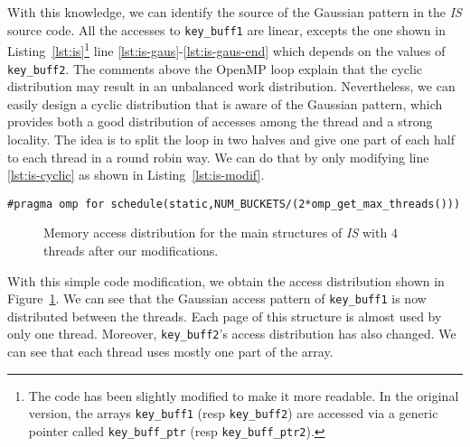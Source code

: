 

With this knowledge, we can identify the source of the
Gaussian pattern in the \emph{IS} source code. All the accesses to \texttt{key\_buff1} are linear,
excepts the one shown in Listing~\ref{lst:is}\footnote{
    The code has been slightly modified to make it more readable. In the
    original version, the arrays \texttt{key\_buff1} (resp \texttt{key\_buff2})
    are accessed via a generic pointer called \texttt{key\_buff\_ptr} (resp
    \texttt{key\_buff\_ptr2}).
}  line \ref{lst:is-gaus}-\ref{lst:is-gaus-end} which depends on the values of
\texttt{key\_buff2}. The comments above the OpenMP loop explain that the
cyclic distribution may result in an unbalanced work distribution. Nevertheless, we can easily design a cyclic
distribution that is aware of the Gaussian pattern, which provides both a good
distribution of accesses among the thread and a strong locality. The idea is to
split the loop in two halves and give one part of each half to each thread in a
round robin way. We can do that by only modifying line \ref{lst:is-cyclic} as
shown in Listing~\ref{lst:is-modif}.
\begin{lstlisting}[float=htb,caption=Optimization for \emph{IS}., label=lst:is-modif]
#pragma omp for schedule(static,NUM_BUCKETS/(2*omp_get_max_threads()))
\end{lstlisting}

\begin{figure}[htb]
    \centering


    \caption{Memory access distribution for the main structures of
        \emph{IS} with $4$ threads after our modifications.}
    \label{fig:is-behaviour-modif}
\end{figure}

With this simple code modification, we obtain the access distribution
shown in Figure~\ref{fig:is-behaviour-modif}. We can see that the Gaussian
access pattern of \texttt{key\_buff1} is now distributed between the threads. Each page
of this structure is almost used by only one thread. Moreover,
\texttt{key\_buff2}'s access distribution has also changed. We can see that
each thread uses mostly one part of the array.

